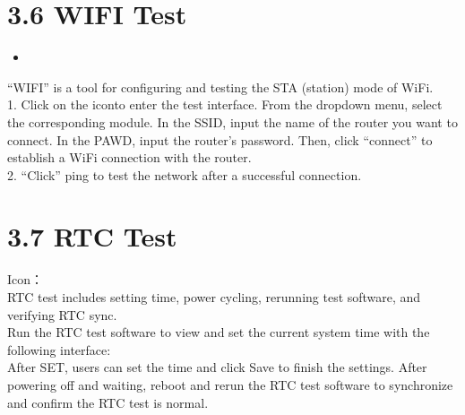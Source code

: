 \documentclass[letterpaper,10pt,openany,english]{sphinxmanual}
\begin{document}
\section{3.6 WIFI Test}
\label{\detokenize{linux-manual:wifi-test}}
\sphinxAtStartPar
{}
\begin{itemize}
\item {} 
\sphinxAtStartPar
{}

\end{itemize}

\sphinxAtStartPar
“WIFI” is a tool for configuring and testing the STA (station) mode of Wi\sphinxhyphen{}Fi.\\
1. Click on the iconto enter the test interface. From the dropdown menu, select the corresponding module. In the SSID, input the name of the router you want to connect. In the PAWD, input the router’s password. Then, click “connect” to establish a WiFi connection with the router.\\
2. “Click” ping to test the network after a successful connection.


\section{3.7 RTC Test}
\label{\detokenize{linux-manual:rtc-test}}
\sphinxAtStartPar
{}

\sphinxAtStartPar
Icon：\\
RTC test includes setting time, power cycling, rerunning test software, and verifying RTC sync.\\
Run the RTC test software to view and set the current system time with the following interface:\\
After SET, users can set the time and click Save to finish the settings. After powering off and waiting, reboot and rerun the RTC test software to synchronize and confirm the RTC test is normal.
\end{document}
